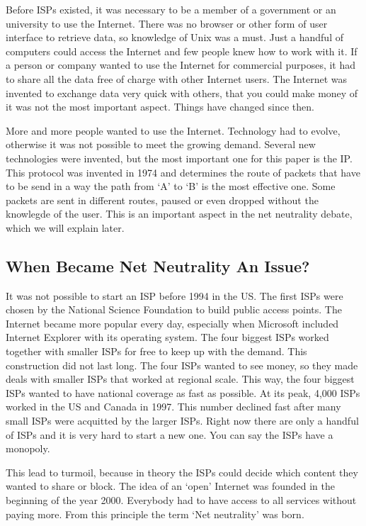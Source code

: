 Before \acp{ISP} existed, it was necessary to be a member of a government or an university to use the Internet. There was no browser or other form of user interface to retrieve data, so knowledge of Unix was a must. Just a handful of computers could access the Internet and few people knew how to work with it. If a person or company wanted to use the Internet for commercial purposes, it had to share all the data free of charge with other Internet users. The Internet was invented to exchange data very quick with others, that you could make money of it was not the most important aspect. Things have changed since then.

More and more people wanted to use the Internet. Technology had to evolve, otherwise it was not possible to meet the growing demand. Several new technologies were invented, but the most important one for this paper is the \acf{IP}. This protocol was invented in 1974 and determines the route of packets that have to be send in a way the path from `A' to `B' is the most effective one. Some packets are sent in different routes, paused or even dropped without the knowlegde of the user. This is an important aspect in the net neutrality debate, which we will explain later.

\subsection{When Became Net Neutrality An Issue?}
It was not possible to start an \ac{ISP} before 1994 in the US. The first \acp{ISP} were chosen by the National Science Foundation to build public access points. The Internet became more popular every day, especially when Microsoft included Internet Explorer with its operating system. The four biggest \acp{ISP} worked together with smaller \acp{ISP} for free to keep up with the demand. This construction did not last long. The four \acp{ISP} wanted to see money, so they made deals with smaller \acp{ISP} that worked at regional scale. This way, the four biggest \acp{ISP} wanted to have national coverage as fast as possible. At its peak, 4,000 \acp{ISP} worked in the US and Canada in 1997. This number declined fast after many small \acp{ISP} were acquitted by the larger \acp{ISP}. Right now there are only a handful of \acp{ISP} and it is very hard to start a new one. You can say the \acp{ISP} have a monopoly.

This lead to turmoil, because in theory the \acp{ISP} could decide which content they wanted to share or block. The idea of an `open' Internet was founded in the beginning of the year 2000. Everybody had to have access to all services without paying more. From this principle the term `Net neutrality' was born.